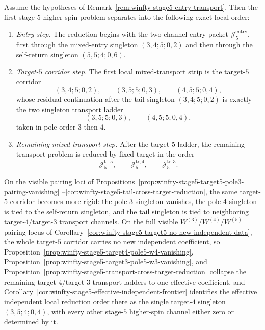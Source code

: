 \begin{proposition}
\label{prop:winfty-stage5-local-reduction-order}
\ClaimStatusConditional
Assume the hypotheses of
Remark~\ref{rem:winfty-stage5-entry-transport}. Then the first
stage-$5$ higher-spin problem separates into the following exact local
order:
\begin{enumerate}[label=\textup{(\roman*)}]
\item \emph{Entry step.} The reduction begins with the two-channel entry
 packet \(\mathcal{J}_5^{\mathrm{entry}}\), first through the
 mixed-entry singleton \((3,4;5;0,2)\) and then through the
 self-return singleton \((5,5;4;0,6)\).
\item \emph{Target-$5$ corridor step.} The first local mixed-transport
 strip is the target-$5$ corridor
 \[
 (3,4;5;0,2),\qquad
 (3,5;5;0,3),\qquad
 (4,5;5;0,4),
 \]
 whose residual continuation after the tail singleton
 \((3,4;5;0,2)\) is exactly the two singleton transport ladder
 \[
 (3,5;5;0,3),\qquad
 (4,5;5;0,4),
 \]
 taken in pole order \(3\) then \(4\).
\item \emph{Remaining mixed transport step.} After the target-$5$
 ladder, the remaining transport problem is reduced by fixed target
 in the order
 \[
 \mathcal{J}_5^{\mathrm{tr},5},\qquad
 \mathcal{J}_5^{\mathrm{tr},4},\qquad
 \mathcal{J}_5^{\mathrm{tr},3}.
 \]
\end{enumerate}
On the visible pairing loci of
Propositions~\ref{prop:winfty-stage5-target5-pole3-pairing-vanishing}
--\ref{cor:winfty-stage5-tail-cross-target-reduction}, the same
target-$5$ corridor becomes more rigid: the pole-$3$ singleton
vanishes, the pole-$4$ singleton is tied to the self-return singleton,
and the tail singleton is tied to neighboring target-$4$/target-$3$
transport channels. On the full visible
\texorpdfstring{$W^{(3)}$}{W3}/\texorpdfstring{$W^{(4)}$}{W4}/\texorpdfstring{$W^{(5)}$}{W5}
pairing locus of
Corollary~\ref{cor:winfty-stage5-target5-no-new-independent-data}, the
whole target-$5$ corridor carries no new independent coefficient, so
Proposition~\ref{prop:winfty-stage5-target4-pole5-w4-vanishing},
Proposition~\ref{prop:winfty-stage5-target3-pole5-w3-vanishing}, and
Proposition~\ref{prop:winfty-stage5-transport-cross-target-reduction}
collapse the remaining target-$4$/target-$3$ transport ladders to one
effective coefficient, and
Corollary~\ref{cor:winfty-stage5-effective-independent-frontier}
identifies the effective independent local reduction order there as the
single target-$4$ singleton \((3,5;4;0,4)\), with every other stage-$5$
higher-spin channel either zero or determined by it.
\end{proposition}

